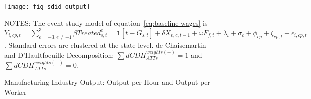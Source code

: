 \begin{figure}[H]
    \centering
    \texttt{[image: fig\_sdid\_output]}
    \caption{Manufacturing Industry Output: Output per Hour and Output per Worker}
    \label{fig:baseline-industry-output}
    \begin{minipage}{14cm}
        \vspace{0.05in}
        NOTES: The event study model of equation~\ref{eq:baseline-wages} is $Y_{i,cp,t} = \sum_{{e = -3},{e \neq -1}}^{3} \beta Treated_{s,t}^e = \textbf{1}[t - G_{s,t}] + \delta X_{v,c,t-1} + \omega F_{f,t} + \lambda_{t} + \sigma_{c} + \phi_{cp} + \zeta_{cp,t} + \epsilon_{i,cp,t}$. Standard errors are clustered at the state level. de Chaisemartin and D'Haultfoeuille Decomposition: $\sum dCDH_{ATTs}^{weights(+)} = 1$ and $\sum dCDH_{ATTs}^{weights(-)} = 0$.
    \end{minipage}
\end{figure}